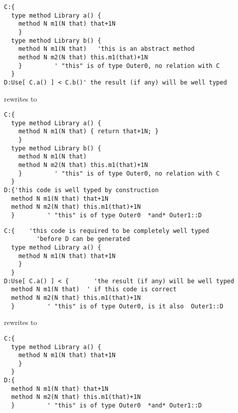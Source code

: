 \begin{frame}[fragile]
\begin{NiceCode}{59ex}{0.8}
\begin{lstlisting}
C:{  
  type method Library a() {
    method N m1(N that) that+1N
    }
  type method Library b() {
    method N m1(N that)   'this is an abstract method
    method N m2(N that) this.m1(that)+1N
    }         ' "this" is of type Outer0, no relation with C
  }
D:Use[ C.a() ] < C.b()' the result (if any) will be well typed
\end{lstlisting}
\end{NiceCode}
rewrites to 

\begin{NiceCode}{59ex}{0.8}
\begin{lstlisting}
C:{
  type method Library a() {
    method N m1(N that) { return that+1N; }
    }
  type method Library b() {
    method N m1(N that)  
    method N m2(N that) this.m1(that)+1N
    }         ' "this" is of type Outer0, no relation with C
  }
D:{'this code is well typed by construction
  method N m1(N that) that+1N
  method N m2(N that) this.m1(that)+1N
  }         ' "this" is of type Outer0  *and* Outer1::D
\end{lstlisting}
\end{NiceCode}
\end{frame}



\begin{frame}[fragile]
\begin{NiceCode}{59ex}{0.8}
\begin{lstlisting}
C:{    'this code is required to be completely well typed 
         'before D can be generated
  type method Library a() {
    method N m1(N that) that+1N
    }
  }
D:Use[ C.a() ] < {       'the result (if any) will be well typed
  method N m1(N that)  ' if this code is correct
  method N m2(N that) this.m1(that)+1N
  }         ' "this" is of type Outer0, is it also  Outer1::D
\end{lstlisting}
\end{NiceCode}
rewrites to 

\begin{NiceCode}{59ex}{0.8}
\begin{lstlisting}
C:{  
  type method Library a() {
    method N m1(N that) that+1N
    }
  }
D:{
  method N m1(N that) that+1N
  method N m2(N that) this.m1(that)+1N
  }         ' "this" is of type Outer0  *and* Outer1::D
\end{lstlisting}
\end{NiceCode}
\end{frame}


